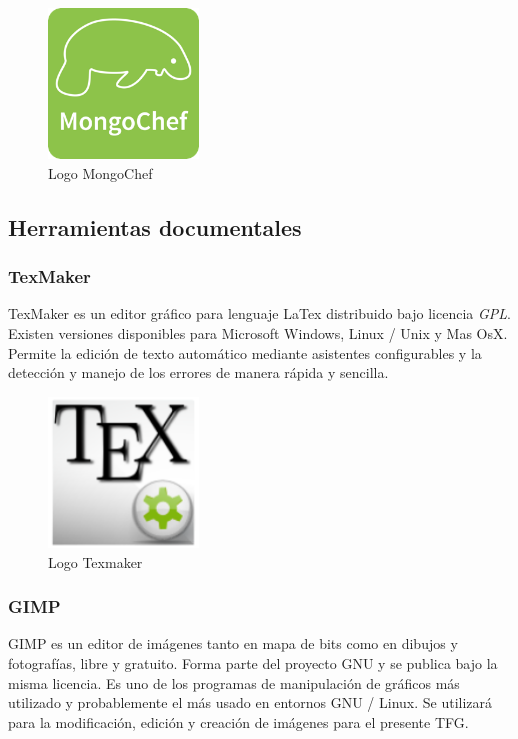 		\begin{figure}[H]
		\centering
		\includegraphics[width=40mm, fbox={\fboxrule} 4mm]{images/04-metodo/32-mongochef_logo.png}
		\caption{Logo MongoChef}
		\label{fig:mongochef-logo}
		\end{figure}
	
	\subsection{Herramientas documentales}
		\subsubsection{TexMaker}
		TexMaker es un editor gráfico para lenguaje LaTex distribuido bajo licencia \textit{\ac{GPL}}. Existen versiones disponibles para Microsoft Windows, Linux / Unix y Mas OsX. Permite la edición de texto automático mediante asistentes configurables y la detección y manejo de los errores de manera rápida y sencilla.
				
		\begin{figure}[H]
		\centering
		\includegraphics[width=40mm, fbox={\fboxrule} 4mm]{images/04-metodo/34-texmaker_logo.png}
		\caption{Logo Texmaker}
		\label{fig:texmaker-logo}
		\end{figure}
		
		\subsubsection{\ac{GIMP}}
		\ac{GIMP} es un editor de imágenes tanto en mapa de bits como en dibujos y fotografías, libre y gratuito. Forma parte del proyecto \ac{GNU} y se publica bajo la misma licencia. Es uno de los programas de manipulación de gráficos más utilizado y probablemente el más usado en entornos GNU / Linux. Se utilizará para la modificación, edición y creación de imágenes para el presente \ac{TFG}.
		
